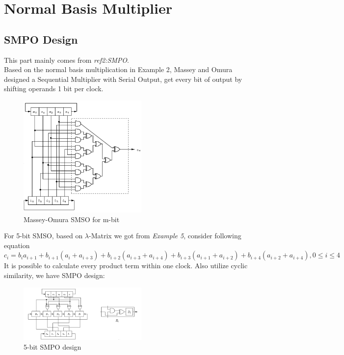 \documentclass[conference]{IEEEtran}
\begin{document}
\section{Normal Basis Multiplier}
	\subsection{SMPO Design}
This part mainly comes from \textit{ref2:SMPO}. \cite{SMPO}\\
Based on the normal basis multiplication in Example 2, Massey and Omura designed a Sequential Multiplier with Serial
Output, get every bit of output by shifting operands 1 bit per clock.
\begin{figure}
\centering
\includegraphics[width=2.5in]{SMSO.png}
\caption{Massey-Omura SMSO for m-bit}
\label{fig_SMSO}
\end{figure}

For 5-bit SMSO, based on $\lambda$-Matrix we got from \textit{Example 5}, consider following equation \\
$c_i = b_ia_{i+1} + b_{i+1}(a_i + a_{i+3}) + b_{i+2}(a_{i+3} + a_{i+4}) + b_{i+3}(a_{i+1} + a_{i+2}) + b_{i+4}
(a_{i+2} + a_{i+4}), 0\leq i\leq 4$\\
It is possible to calculate every product term within one clock. Also utilize cyclic similarity, we have SMPO
design:
\begin{figure}
\centering
\includegraphics[width=2.5in]{SMPO.png}
\caption{5-bit SMPO design}
\label{fig_SMPO}
\end{figure}
\end{document}
